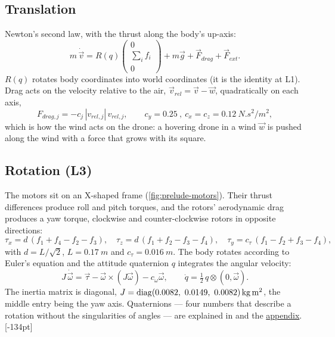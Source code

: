 \subsection*{Translation}
Newton's second law, with the thrust along the body's up-axis:
\begin{equation}\label{eq:prelude-trans}
  m\,\dot{\vec v} = R(q)\begin{pmatrix}0\\ \textstyle\sum_i f_i\\ 0\end{pmatrix} + m\vec g + \vec F_{drag} + \vec F_{ext}.
\end{equation}
$R(q)$ rotates body coordinates into world coordinates (it is the identity at L1). Drag acts on the velocity relative to the air, $\vec v_{rel} = \vec v - \vec w$, quadratically on each axis,
\begin{equation}
  F_{drag,j} = -c_j\,|v_{rel,j}|\,v_{rel,j},\qquad c_y = \SI{0.25}{}, \ c_x = c_z = \SI{0.12}{N.s^2/m^2},
\end{equation}
which is how the wind acts on the drone: a hovering drone in a wind $\vec w$ is pushed along the wind with a force that grows with its square.

\subsection*{Rotation (L3)}
The motors sit on an X-shaped frame (\cref{fig:prelude-motors}). Their thrust differences produce roll and pitch torques, and the rotors' aerodynamic drag produces a yaw torque, clockwise and counter-clockwise rotors in opposite directions:
\begin{equation}
  \tau_x = d\,(f_1 + f_4 - f_2 - f_3),\quad
  \tau_z = d\,(f_1 + f_2 - f_3 - f_4),\quad
  \tau_y = c_\tau\,(f_1 - f_2 + f_3 - f_4),
\end{equation}
with $d = L/\sqrt2$, $L = \SI{0.17}{m}$ and $c_\tau = \SI{0.016}{m}$. The body rotates according to Euler's equation and the attitude quaternion $q$ integrates the angular velocity:
\begin{equation}\label{eq:prelude-rot}
  J\,\dot{\vec\omega} = \vec\tau - \vec\omega \times (J\vec\omega) - c_\omega\vec\omega ,\qquad
  \dot q = \tfrac12\,q\otimes(0, \vec\omega).
\end{equation}
The inertia matrix is diagonal, $J = \diag(0.0082,\ 0.0149,\ 0.0082)\,\si{kg.m^2}$, the middle entry being the yaw axis. Quaternions — four numbers that describe a rotation without the singularities of angles — are explained in  and the \hyperref[app:quat]{appendix}.
[-134pt]

